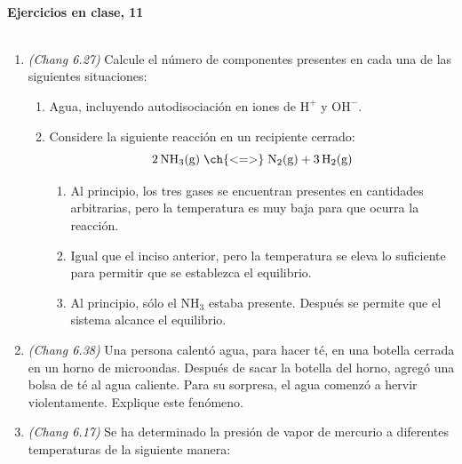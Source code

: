 \documentclass[a4paper,12pt]{article}
\begin{document}

\begin{center}
\HRule \\[0.4cm]
{ \bfseries Ejercicios en clase, 11}\\ %
\HRule \\[0.4cm]
\end{center}


\begin{enumerate}

 \item \textit{(Chang 6.27)} Calcule el n\'umero de componentes presentes en cada una de las siguientes situaciones:
\begin{enumerate}
 \item Agua, incluyendo autodisociaci\'on en iones de $\mbox{H}^+$ y $\mbox{OH}^-$.
 \item Considere la siguiente reacci\'on en un recipiente cerrado:
$$2\,\mbox{NH}_3\mbox{(g)}\;\ch{ <=> }\;\mbox{N}_2\mbox{(g)}+3\,\mbox{H}_2\mbox{(g)}$$
 \begin{enumerate}
  \item Al principio, los tres gases se encuentran presentes en cantidades arbitrarias, pero la temperatura es muy baja para que ocurra la reacci\'on.
  \item Igual que el inciso anterior, pero la temperatura se eleva lo suficiente para permitir que se establezca el equilibrio.
  \item Al principio, s\'olo el $\mbox{NH}_3$ estaba presente. Despu\'es se permite que el sistema alcance el equilibrio.
 \end{enumerate}
\end{enumerate} %

 \item \textit{(Chang 6.38)} Una persona calent\'o agua, para hacer t\'e, en una botella cerrada en un horno de microondas. Despu\'es de sacar la botella del horno, agreg\'o una bolsa de t\'e al agua caliente. Para su sorpresa, el agua comenz\'o a hervir violentamente. Explique este fen\'omeno. %

 \item \textit{(Chang 6.17)} Se ha determinado la presi\'on de vapor de mercurio a diferentes temperaturas de la siguiente manera:


\end{enumerate}
\end{document}
